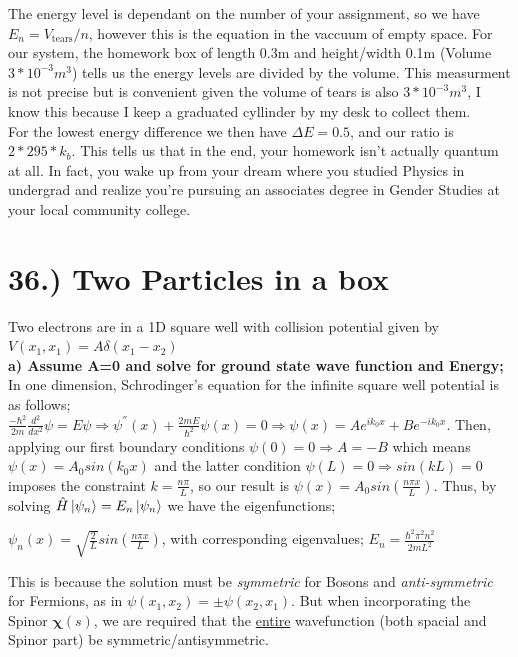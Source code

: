 \documentclass{journal}
\begin{document}
The energy level is dependant on the number of your assignment, so we have $E_n={V_\text{tears}}/{n}$, however this is the equation in the vaccuum of empty space. For our system, the homework box of length 0.3m and height/width 0.1m (Volume $3*10^{-3}m^3$) tells us the energy levels are divided by the volume. This measurment is not precise but is convenient given the volume of tears is also $3*10^{-3}m^3$, I know this because I keep a graduated cyllinder by my desk to collect them.\\

For the lowest energy difference we then have $\Delta E=0.5$, and our ratio is $2*295*k_b$. This tells us that in the end, your homework isn't actually quantum at all. In fact, you wake up from your dream where you studied Physics in undergrad and realize you're pursuing an associates degree in Gender Studies at your local community college.

%
%
%
%
%
\pagebreak
\section*{36.) Two Particles in a box}
Two electrons are in a 1D square well with collision potential given by $V(x_1,x_1)=A\delta(x_1-x_2)$\\
\textbf{a) Assume A=0 and solve for ground state wave function and Energy;}\\

In one dimension, Schrodinger's equation for the infinite square well potential is as follows;\\
$\frac{-\hbar^2}{2m}\frac{d^2}{dx^2}\psi=E\psi\Rightarrow\psi^{''}(x)+\frac{2mE}{\hbar^2}\psi(x)=0\Rightarrow\psi(x)=Ae^{ik_0x}+Be^{-ik_0x}$. Then, applying our first boundary conditions $\psi(0)=0\Rightarrow A=-B$ which means $\psi(x)=A_0sin(k_0x)$ and the latter condition $\psi(L)=0\Rightarrow sin(kL)=0$ imposes the constraint $k=\frac{n\pi}{L}$, so our result is $\psi(x)=A_0sin(\frac{n\pi x}{L})$. Thus, by solving $\hat{H}\ket{\psi_n}=E_n\ket{\psi_n}$ we have the eigenfunctions;
\begin{center}
$\psi_n(x)=\sqrt{\frac2L}sin(\frac{n\pi x}L)$,  with corresponding eigenvalues;  $E_n=\frac{\hbar^2\pi^2n^2}{2mL^2}$\\
\end{center}
This is because the solution must be \textit{symmetric} for Bosons and \textit{anti-symmetric} for Fermions, as in $\psi(x_1,x_2)=\pm\psi(x_2,x_1)$.  But when incorporating the Spinor $\bm{\chi}(s)$, we are required that the \underline{entire} wavefunction (both spacial and Spinor part) be symmetric/antisymmetric.
\end{document}
